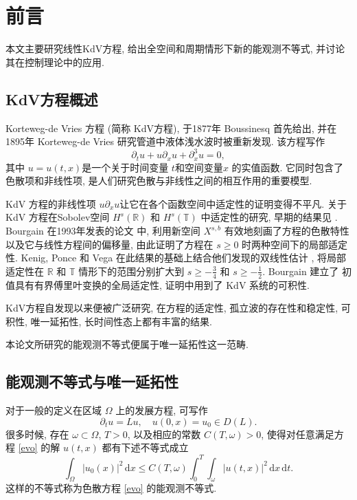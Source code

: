 \documentclass[master]{cugthesis}
\newcommand\R{\ensuremath{\mathbb{R}}}
\newcommand\T{\ensuremath{\mathbb{T}}}
\renewcommand\d{\ensuremath{\,\mathrm{d}}}
\begin{document}
    \makefrontpages 
    \chapter{前言}
    本文主要研究线性KdV方程, 给出全空间和周期情形下新的能观测不等式, 并讨论其在控制理论中的应用.
    \section{KdV方程概述}
    Korteweg-de Vries 方程 (简称 KdV方程), 于1877年 Boussinesq\cite{Bouss1877} 首先给出, 并在1895年 Korteweg-de Vries \cite{Kort1895} 研究管道中液体浅水波时被重新发现. 该方程写作
    \begin{equation}
        \partial_t u +u \partial_x u +\partial_x^3 u =0,\label{kdv}
    \end{equation}
    其中 $u=u(t,x)$是一个关于时间变量 $t$和空间变量$x$ 的实值函数. 它同时包含了色散项和非线性项, 是人们研究色散与非线性之间的相互作用的重要模型.
    
    KdV 方程的非线性项 $u\partial_x u$让它在各个函数空间中适定性的证明变得不平凡. 关于 KdV 方程在Sobolev空间 $H^s(\R)$ 和 $H^s(\T)$ 中适定性的研究, 早期的结果见 \cite{bona1975initial, kato1979cauchy,cohen1979existence,ginibre1990existence,kenig1993well}. Bourgain 在1993年发表的论文\cite{bourgain1993fourier} 中, 利用新空间 $X^{s,b}$ 有效地刻画了方程的色散特性以及它与线性方程间的偏移量, 由此证明了方程在 $s\ge 0$ 时两种空间下的局部适定性. Kenig, Ponce 和 Vega 在此结果的基础上结合他们发现的双线性估计 \cite{kenig1996bilinear}, 将局部适定性在 $\R$ 和 $\T$ 情形下的范围分别扩大到 $s\ge -\frac{3}{4}$ 和 $s\ge -\frac{1}{2}$. Bourgain 建立了\cite{bourgain1997periodic} 初值具有有界傅里叶变换的全局适定性, 证明中用到了 KdV 系统的可积性.
    
    
    
    
    KdV方程自发现以来便被广泛研究, 在方程的适定性, 孤立波的存在性和稳定性, 可积性, 唯一延拓性, 长时间性态上都有丰富的结果. 
    
    本论文所研究的能观测不等式便属于唯一延拓性这一范畴.
    
    
    \section{能观测不等式与唯一延拓性}
    对于一般的定义在区域 $\Omega$ 上的发展方程, 可写作
    \begin{equation}\label{evo}
        \partial_t u = L u, \quad u(0,x)=u_0\in D(L).
    \end{equation}
    很多时候, 存在 $\omega\subset \Omega$, $T>0$, 以及相应的常数 $C(T,\omega)>0$, 使得对任意满足方程 \eqref{evo} 的解 $u(t,x)$ 都有下述不等式成立
    \begin{equation}\label{init}
        \int_{\Omega}|u_0(x)|^2\d x\le C(T,\omega)\int_0^T\int_\omega|u(t,x)|^2\d x\d t.
    \end{equation}
    这样的不等式称为色散方程 \eqref{evo} 的能观测不等式. 
\end{document}

